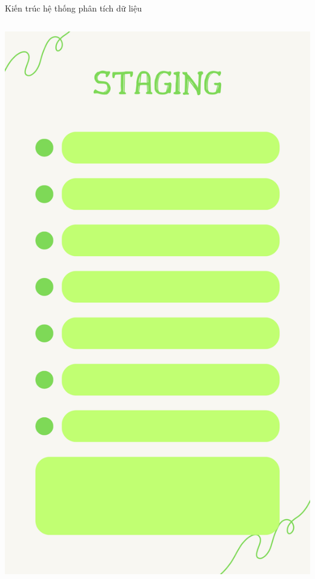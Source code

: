 \documentclass{beamer}
\begin{document}
\begin{frame}{Kiến trúc hệ thống phân tích dữ liệu}
\begin{columns}
\begin{column}{0.24\textwidth}
\includegraphics[width=\textwidth]{pictures/STAGING.png}
\end{column}


\end{columns}
\end{frame}
\end{document}

